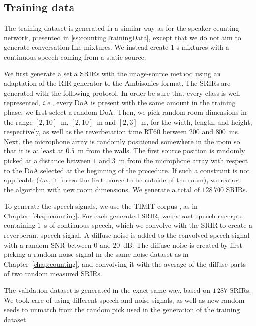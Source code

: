 \subsection{Training data}
\label{ss:tdvvTrainingData}

The training dataset is generated in a similar way as for the speaker counting network, presented in \ref{ss:countingTrainingData}, except that we do not aim to generate conversation-like mixtures. We instead create $1$-s mixtures with a continuous speech coming from a static source.

We first generate a set a SRIRs with the image-source method \cite{allen_image_1979} using an adaptation of the RIR generator \cite{habets_room_2006} to the Ambisonics format. The SRIRs are generated with the following protocol. In order be sure that every class is well represented, \emph{i.e.}, every DoA is present with the same amount in the training phase, we first select a random DoA. Then, we pick random room dimensions in the range $[2,10]$~m, $[2,10]$~m and $[2,3]$~m, for the width, length, and height, respectively, as well as the reverberation time RT60 between $200$ and $800$~ms. Next, the microphone array is randomly positioned somewhere in the room so that it is at least at $0.5$~m from the walls. The first source position is randomly picked at a distance between $1$ and $3$~m from the microphone array with respect to the DoA selected at the beginning of the procedure. If such a constraint is not applicable (\emph{i.e.}, it forces the first source to be outside of the room), we restart the algorithm with new room dimensions. We generate a total of $128\,700$ SRIRs.

To generate the speech signals, we use the TIMIT corpus \cite{garofolo_timit_1993}, as in Chapter~\ref{chap:counting}. For each generated SRIR, we extract speech excerpts containing $1$~s of continuous speech, which we convolve with the SRIR to create a reverberant speech signal. A diffuse noise is added to the convolved speech signal with a random SNR between $0$ and $20$~dB. The diffuse noise is created by first picking a random noise signal in the same noise dataset as in Chapter~\ref{chap:counting}, and convolving it with the average of the diffuse parts of two random measured SRIRs.

The validation dataset is generated in the exact same way, based on $1\,287$ SRIRs. We took care of using different speech and noise signals, as well as new random seeds to unmatch from the random pick used in the generation of the training dataset.

